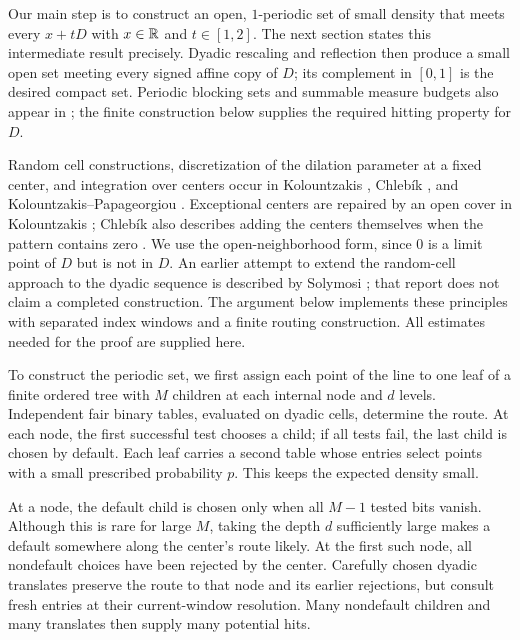 Our main step is to construct an open, $1$-periodic set of small density
that meets every $x+tD$ with $x\in\mathbb R$ and $t\in[1,2]$. The next section
states this intermediate result precisely. Dyadic rescaling and
reflection then produce a small open set meeting every signed affine
copy of $D$; its complement in $[0,1]$ is the desired compact set.
Periodic blocking sets and summable measure budgets also appear in
\cite[Lemma~3.1 and Proposition~3.2]{IKMRY2026Rajchman}; the finite construction below supplies
the required hitting property for $D$.

Random cell constructions, discretization of the dilation parameter at
a fixed center, and integration over centers occur in
Kolountzakis \cite[Section~3.2]{Kolountzakis1997},
Chleb\'ik \cite[Section~5]{Chlebik2015}, and
Kolountzakis--Papageorgiou
\cite[Section~3.1]{KolountzakisPapageorgiou2025}.
Exceptional centers are repaired by an open cover in Kolountzakis
\cite[Sections~2.2 and~3.2]{Kolountzakis1997}; Chleb\'ik also describes
adding the centers themselves when the pattern contains zero
\cite[Section~3, final remark]{Chlebik2015}.
We use the open-neighborhood form, since $0$ is a limit point of $D$
but is not in $D$.
An earlier attempt to extend the random-cell approach to the dyadic
sequence is described by Solymosi \cite[Section~3]{Solymosi2011Sparse};
that report does not claim a completed construction.
The argument below implements these principles with separated index
windows and a finite routing construction. All estimates needed for the
proof are supplied here.

To construct the periodic set, we first assign each point of the line to
one leaf of a finite ordered tree with $M$ children at each internal
node and $d$ levels. Independent fair binary tables, evaluated on
dyadic cells, determine the route. At each node, the first successful
test chooses a child; if all tests fail, the last child is chosen by
default. Each leaf carries a second table
whose entries select points with a small prescribed probability $p$.
This keeps the expected density small.

At a node, the default child is chosen only when all $M-1$ tested bits
vanish. Although this is rare for large $M$, taking the depth $d$
sufficiently large makes a default somewhere along the center's route
likely. At the first such node, all nondefault choices have been rejected
by the center. Carefully chosen dyadic translates preserve the route to
that node and its earlier rejections, but consult fresh entries at their
current-window resolution. Many nondefault children and many translates
then supply many potential hits.

